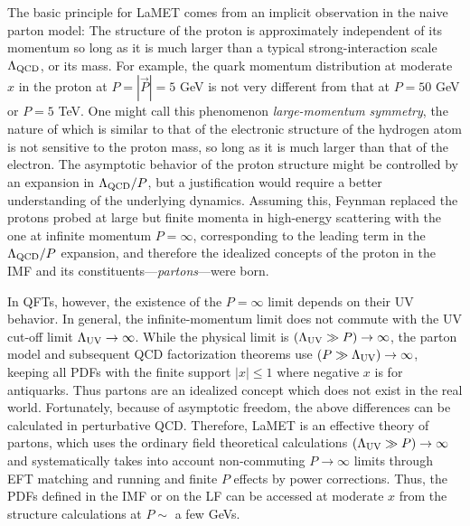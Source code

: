The basic principle for LaMET comes from an implicit
observation in the naive parton model:
The structure of the proton is approximately
independent of its momentum so long as it is much larger than
a typical strong-interaction scale $\Lambda_{\rm QCD}$, or its mass.
For example, the quark momentum distribution at moderate $x$ in the proton
at $P=|\vec{P}|=5$ GeV is not very different from that
at $P=50$ GeV or $P=5$ TeV. One might call this phenomenon
{\it large-momentum symmetry}, the nature of which is similar to that of the electronic
structure of the hydrogen atom is not sensitive to the proton mass, so long
as it is much larger than that of the electron.
The asymptotic behavior of the proton structure might be
controlled by an expansion in $\Lambda_{\rm QCD}/P$, but a justification would
require a better understanding of the underlying
dynamics. Assuming this, Feynman replaced the protons probed
at large but finite momenta in high-energy scattering with
the one at infinite momentum $P=\infty$,
corresponding to the leading term in the $\Lambda_{\rm QCD}/P$ expansion, and therefore
the idealized concepts of {\rm the proton in the IMF}
and its constituents---{\it partons}---were born.

In QFTs, however, the existence of the $P=\infty$ limit
depends on their UV behavior. In general, the infinite-momentum limit
does not commute with the UV cut-off limit $\Lambda_{\rm UV}\to \infty$.
While the physical limit is $(\Lambda_{\rm UV}\gg P) \to\infty$,
the parton model and subsequent QCD factorization
theorems use $(P\gg\Lambda_{\rm UV})\to\infty$, keeping
all PDFs with the finite support $|x|\le 1$ where negative $x$ is for antiquarks. Thus partons are an idealized concept
which does not exist in the real world.
Fortunately, because of asymptotic freedom, the above differences can be calculated in perturbative QCD.
Therefore, LaMET is an effective theory of partons, which uses the ordinary
field theoretical calculations $(\Lambda_{\rm UV}\gg P)\to\infty$ and
systematically takes into account non-commuting $P\to\infty$ limits through
EFT matching and running and finite $P$ effects by power corrections. Thus, the PDFs defined in the IMF
or on the LF can be accessed at moderate $x$ from the structure
calculations at $P\sim $ a few GeVs.

